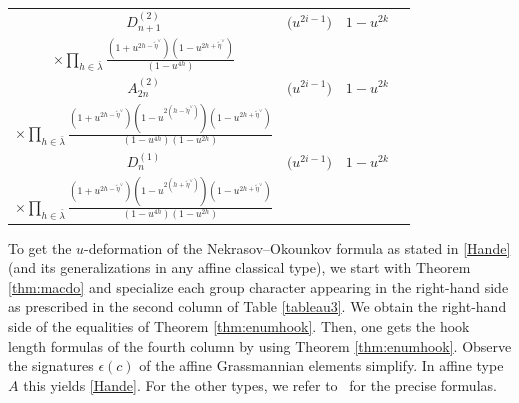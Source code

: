 \documentclass[10pt,a4paper]{amsart}
\numberwithin{equation}{section}
\def\cch{\mathcal H}
\begin{document}
\begin{table}[th]
\begin{tabular}{|c|c|c|c|}
\hline
\rule{0pt}{15pt}$D^{(2)}_{n+1}$& $\bigl(u^{2i-1}\bigr)$ & $1-u^{2k}$& \makecell{
$\varepsilon(c)(-1)^{\ell\bigl(\bar{\lambda}\bigr)}\displaystyle \prod_{h\in\cch(\lambda)_T}\frac{(1-u^{2(h-\tilde{\eta}^{\vee})})(1-u^{2(h+\tilde{\eta}^{\vee})})}{(1-u^{2h})^2}$\vspace{1mm}\\
$\displaystyle \times \prod_{h\in\bar{\lambda}}\frac{(1+u^{2h-\tilde{\eta}^{\vee}})(1-u^{2h+\tilde{\eta}^{\vee}})}{(1-u^{4h})}$}
\\
\hline
\rule{0pt}{15pt}$A^{(2)}_{2n}$& $\bigl(u^{2i-1}\bigr)$ & $1-u^{2k}$&\makecell{
$\varepsilon(c)\displaystyle u^{\tilde{\eta}^{\vee}\ell\bigl(\bar{\lambda}\bigr)} \prod_{h\in\cch(\lambda)_T}\frac{(1-u^{2(h-\tilde{\eta}^{\vee})})(1-u^{2(h+\tilde{\eta}^{\vee})})}{(1-u^{2h})^2}$\vspace{1mm}\\ $\displaystyle\times\prod_{h\in\bar{\lambda}}\frac{(1+u^{2h-\tilde{\eta}^{\vee}})(1-u^{2(h-\tilde{\eta}^{\vee})})(1-u^{2h+\tilde{\eta}^{\vee}})}{(1-u^{4h})(1-u^{2h})}$}
\\
\hline
\rule{0pt}{15pt}$D^{(1)}_{n}$& $\bigl(u^{2i-1}\bigr)$ & $1-u^{2k}$&\makecell{
$\varepsilon(c)(-1)^{\ell\bigl(\bar{\lambda}\bigr)}\displaystyle u^{-2\tilde{\eta}^{\vee}\ell\bigl(\bar{\lambda}\bigr)}\prod_{h\in\cch(\lambda)_T} \frac{(1-u^{2(h-\tilde{\eta}^{\vee})})(1-u^{2(h+\tilde{\eta}^{\vee})})}{(1-u^{2h})^2}
$
\vspace{1mm}\\
$\displaystyle\times \prod_{h\in\bar{\lambda}}\frac{(1+u^{2h-\tilde{\eta}^{\vee}})(1-u^{2(h+\tilde{\eta}^{\vee})}) (1-u^{2h+\tilde{\eta}^{\vee}})}{(1-u^{4h})(1-u^{2h})}$}
\\
\hline
\end{tabular}
\end{table}

To get the $u$-deformation of the Nekrasov--Okounkov formula as stated in \eqref{Hande} (and its generalizations in any affine classical type), we start with Theorem \ref{thm:macdo} and specialize each group character appearing in the right-hand side as prescribed in the second column of Table \ref{tableau3}. We obtain the right-hand side of the equalities of Theorem \ref{thm:enumhook}.
Then, one gets the hook length formulas of the fourth column by using Theorem \ref{thm:enumhook}. Observe the signatures $\epsilon(c)$ of the affine Grassmannian elements simplify. In affine type $A$ this yields \eqref{Hande}. For the other types, we refer to~\cite[Section 5.3]{Wmac} for the precise formulas.
\end{document}
